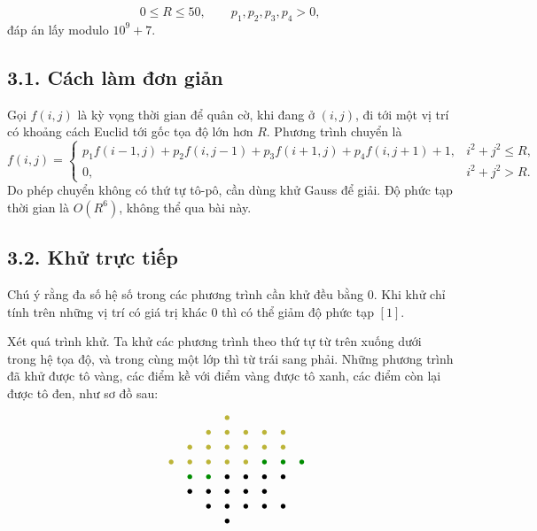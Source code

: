 \documentclass[11pt]{article}
\begin{document}
\[
  0\le R\le50,\qquad p_1,p_2,p_3,p_4>0,
\]
đáp án lấy modulo \(10^9+7\).

\subsection*{3.1. Cách làm đơn giản}

Gọi \(f(i,j)\) là kỳ vọng thời gian để quân cờ, khi đang ở \((i,j)\), đi tới
một vị trí có khoảng cách Euclid tới gốc tọa độ lớn hơn \(R\). Phương trình
chuyển là
\[
  f(i,j)=
  \begin{cases}
    p_1f(i-1,j)+p_2f(i,j-1)+p_3f(i+1,j)+p_4f(i,j+1)+1,
      & i^2+j^2\le R,\\
    0, & i^2+j^2>R.
  \end{cases}
\]
Do phép chuyển không có thứ tự tô-pô, cần dùng khử Gauss để giải. Độ phức tạp
thời gian là \(O(R^6)\), không thể qua bài này.

\subsection*{3.2. Khử trực tiếp}

Chú ý rằng đa số hệ số trong các phương trình cần khử đều bằng \(0\). Khi khử
chỉ tính trên những vị trí có giá trị khác \(0\) thì có thể giảm độ phức tạp
\([1]\).

Xét quá trình khử. Ta khử các phương trình theo thứ tự từ trên xuống dưới
trong hệ tọa độ, và trong cùng một lớp thì từ trái sang phải. Những phương
trình đã khử được tô vàng, các điểm kề với điểm vàng được tô xanh, các điểm
còn lại được tô đen, như sơ đồ sau:
\[
\begin{array}{ccccccccc}
&&&&\textcolor{yellow!70!black}{\bullet}&&&&\\
&&&\textcolor{yellow!70!black}{\bullet}&\textcolor{yellow!70!black}{\bullet}&
\textcolor{yellow!70!black}{\bullet}&\textcolor{yellow!70!black}{\bullet}&
\textcolor{yellow!70!black}{\bullet}&\\
&&\textcolor{yellow!70!black}{\bullet}&\textcolor{yellow!70!black}{\bullet}&
\textcolor{yellow!70!black}{\bullet}&\textcolor{yellow!70!black}{\bullet}&
\textcolor{yellow!70!black}{\bullet}&\textcolor{yellow!70!black}{\bullet}&\\
&\textcolor{yellow!70!black}{\bullet}&\textcolor{yellow!70!black}{\bullet}&
\textcolor{yellow!70!black}{\bullet}&\textcolor{yellow!70!black}{\bullet}&
\textcolor{yellow!70!black}{\bullet}&\textcolor{green!55!black}{\bullet}&
\textcolor{green!55!black}{\bullet}&\textcolor{green!55!black}{\bullet}\\
&&\textcolor{green!55!black}{\bullet}&\textcolor{green!55!black}{\bullet}&
\bullet&\bullet&\bullet&\bullet&\\
&&\bullet&\bullet&\bullet&\bullet&\bullet&&\\
&&&\bullet&\bullet&\bullet&\bullet&\bullet&\\
&&&&\bullet&&&&
\end{array}
\]
\end{document}
